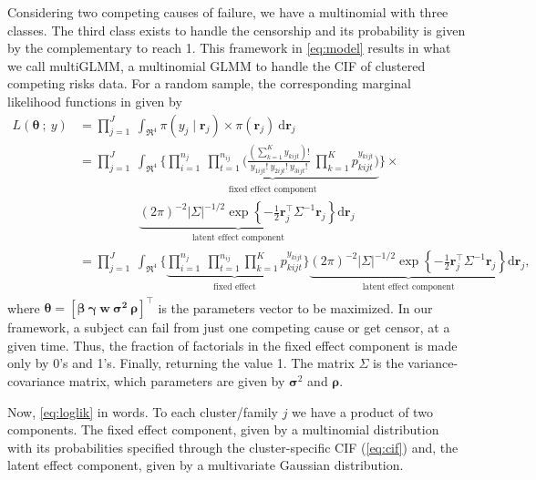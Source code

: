 Considering two competing causes of failure, we have a multinomial with
three classes. The third class exists to handle the censorship and its
probability is given by the complementary to reach 1. This framework in
\autoref{eq:model} results in what we call multiGLMM, a multinomial
GLMM to handle the CIF of clustered competing risks data. For a random
sample, the corresponding marginal likelihood functions in given by
\begin{align}
 L(\bm{\theta}~;~y)
 &= \prod_{j=1}^{J}~\int_{\Re^{4}}
    \pi(y_{j} \mid \bm{r}_{j})\times\pi(\bm{r}_{j})~\text{d}\bm{r}_{j}
    \nonumber\\
 &= \prod_{j=1}^{J}~\int_{\Re^{4}}
    \Bigg\{
    \underbrace{\prod_{i=1}^{n_{j}}~\prod_{t=1}^{n_{ij}}
    \Bigg(
    \frac{(\sum_{k=1}^{K}y_{kijt})!}{y_{1ijt}!~y_{2ijt}!~y_{3ijt}!}~
    \prod_{k=1}^{K} p_{kijt}^{y_{kijt}}
    \Bigg)}_{\substack{\text{fixed effect component}}}
  \Bigg\}\times\nonumber\\
 &\hspace{2cm}\underbrace{
   (2\pi)^{-2} |\Sigma|^{-1/2} \exp
   \left\{-\frac{1}{2}\bm{r}_{j}^{\top} \Sigma^{-1} \bm{r}_{j}\right\}
   }_{\substack{\text{latent effect component}}}
   \text{d}\bm{r}_{j}\nonumber\\
 &= \prod_{j=1}^{J}~\int_{\Re^{4}}
    \Bigg\{
    \underbrace{\prod_{i=1}^{n_{j}}~\prod_{t=1}^{n_{ij}}
    \prod_{k=1}^{K} p_{kijt}^{y_{kijt}}
    }_{\substack{\text{fixed effect}}}
   \Bigg\}\underbrace{
   (2\pi)^{-2} |\Sigma|^{-1/2} \exp
   \left\{-\frac{1}{2}\bm{r}_{j}^{\top} \Sigma^{-1} \bm{r}_{j}\right\}
   }_{\substack{\text{latent effect component}}}
   \text{d}\bm{r}_{j}\label{eq:loglik},
\end{align}
where \(\bm{\theta} = [\bm{\beta}~\bm{\gamma}~\bm{w}~\bm{\sigma^{2}}~
\bm{\rho}]^{\top}\) is the parameters vector to be maximized. In our
framework, a subject can fail from just one competing cause or get
censor, at a given time. Thus, the fraction of factorials in the fixed
effect component is made only by 0's and 1's. Finally, returning the
value 1. The matrix \(\Sigma\) is the variance-covariance matrix, which
parameters are given by \(\bm{\sigma}^{2}\) and \(\bm{\rho}\).

Now, \autoref{eq:loglik} in words. To each cluster/family \(j\) we have
a product of two components. The fixed effect component, given by a
multinomial distribution with its probabilities specified through the
cluster-specific CIF (\autoref{eq:cif}) and, the latent effect
component, given by a multivariate Gaussian distribution.

